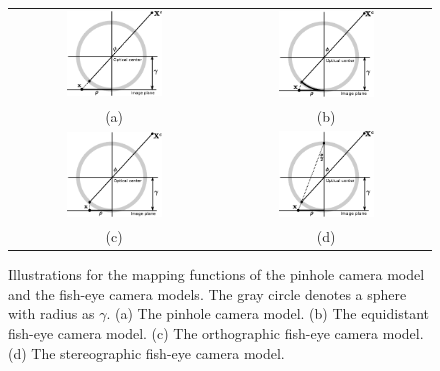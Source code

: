 \documentclass{report}
\begin{document}
\begin{figure}
\centering
\begin{tabular}{cc}
\includegraphics[width=0.48\textwidth]{images/pinholeMapping.eps} &
\includegraphics[width=0.48\textwidth]{images/equidistant.eps} \\
(a) & (b) \\
\includegraphics[width=0.48\textwidth]{images/orthographic.eps} &
\includegraphics[width=0.48\textwidth]{images/stereographic.eps} \\
(c) & (d)
\end{tabular}
\caption{Illustrations for the mapping functions of the pinhole camera model and the fish-eye camera models. The gray circle denotes a sphere with radius as $\gamma$. (a) The pinhole camera model. (b) The equidistant fish-eye camera model. (c) The orthographic fish-eye camera model. (d) The stereographic fish-eye camera model. }
\label{mappingFig}
\end{figure}
\end{document}
